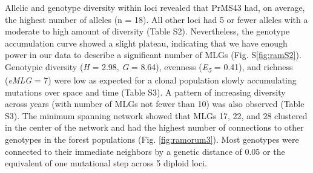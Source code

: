 \documentclass[double,12pt]{beavtex}
\begin{document}
  Allelic and genotype diversity within loci revealed that PrMS43 had, on
  average, the highest number of alleles (n = 18). All other loci had 5 or
  fewer alleles with a moderate to high amount of diversity (Table S2).
  Nevertheless, the genotype accumulation curve showed a slight plateau,
  indicating that we have enough power in our data to describe a
  significant number of MLGs (Fig. S\ref{fig:ramS2}). Genotypic diversity
  (\emph{H} = 2.98, \emph{G} = 8.64), evenness (\emph{E\textsubscript{5}}
  = 0.41), and richness (\emph{eMLG} = 7) were low as expected for a
  clonal population slowly accumulating mutations over space and time
  (Table S3). A pattern of increasing diversity across years (with number
  of MLGs not fewer than 10) was also observed (Table S3). The minimum
  spanning network showed that MLGs 17, 22, and 28 clustered in the center
  of the network and had the highest number of connections to other
  genotypes in the forest populations (Fig. \ref{fig:ramorum3}). Most
  genotypes were connected to their immediate neighbors by a genetic
  distance of 0.05 or the equivalent of one mutational step across 5
  diploid loci.
  
\end{document}
